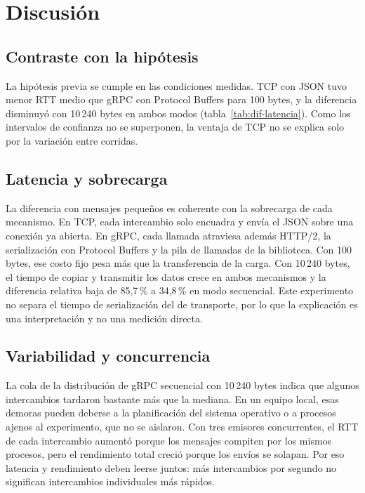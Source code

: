 \section{Discusión}

\subsection{Contraste con la hipótesis}

La hipótesis previa se cumple en las condiciones medidas. TCP con JSON tuvo menor
RTT medio que gRPC con Protocol Buffers para 100 bytes, y la diferencia disminuyó
con 10\,240 bytes en ambos modos (tabla~\ref{tab:dif-latencia}). Como los
intervalos de confianza no se superponen, la ventaja de TCP no se explica solo por
la variación entre corridas.

\subsection{Latencia y sobrecarga}

La diferencia con mensajes pequeños es coherente con la sobrecarga de cada
mecanismo. En TCP, cada intercambio solo encuadra y envía el JSON sobre una conexión
ya abierta. En gRPC, cada llamada atraviesa además HTTP/2, la serialización con
Protocol Buffers y la pila de llamadas de la biblioteca. Con 100 bytes, ese costo
fijo pesa más que la transferencia de la carga. Con 10\,240 bytes, el tiempo de
copiar y transmitir los datos crece en ambos mecanismos y la diferencia relativa
baja de 85,7\,\% a 34,8\,\% en modo secuencial. Este experimento no separa el tiempo
de serialización del de transporte, por lo que la explicación es una interpretación
y no una medición directa.

\subsection{Variabilidad y concurrencia}

La cola de la distribución de gRPC secuencial con 10\,240 bytes indica que algunos
intercambios tardaron bastante más que la mediana. En un equipo local, esas
demoras pueden deberse a la planificación del sistema operativo o a procesos ajenos
al experimento, que no se aislaron. Con tres emisores concurrentes, el RTT de cada
intercambio aumentó porque los mensajes compiten por los mismos procesos, pero el
rendimiento total creció porque los envíos se solapan. Por eso latencia y
rendimiento deben leerse juntos: más intercambios por segundo no significan
intercambios individuales más rápidos.

